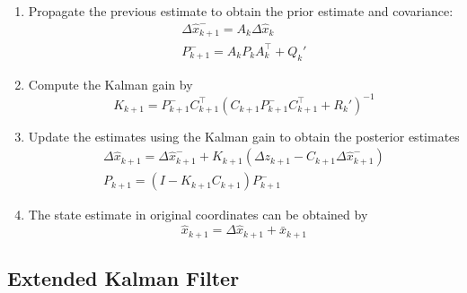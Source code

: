 \documentclass[11pt]{report} %
\begin{document}
\begin{enumerate}
\item Propagate the previous estimate to obtain the prior estimate and covariance:
\begin{gather}
\Delta \hat{x}_{k + 1}^{-} = A_{k}\Delta \hat{x}_{k} \\
P_{k + 1}^{-} = A_{k}P_{k}A_{k}^{\top} + Q_{k}'
\end{gather}
\item Compute the Kalman gain by
\begin{equation}
K_{k + 1} = P_{k + 1}^{-}C_{k + 1}^{\top}\left(C_{k + 1}P_{k + 1}^{-}C_{k + 1}^{\top} + R_{k}'\right)^{-1}
\end{equation}
\item Update the estimates using the Kalman gain to obtain the posterior estimates
\begin{gather}
\Delta \hat{x}_{k + 1} = \Delta \hat{x}_{k + 1}^{-} + K_{k + 1}\left(\Delta z_{k + 1} - C_{k + 1}\Delta \hat{x}_{k + 1}^{-}\right) \\
P_{k + 1} = \left(I - K_{k + 1}C_{k + 1}\right)P_{k + 1}^{-}
\end{gather}
\item The state estimate in original coordinates can be obtained by
\begin{equation}
\hat{x}_{k + 1} = \Delta \hat{x}_{k + 1} + \bar{x}_{k + 1}
\end{equation}
\end{enumerate}

\subsection{Extended Kalman Filter}
\end{document}

